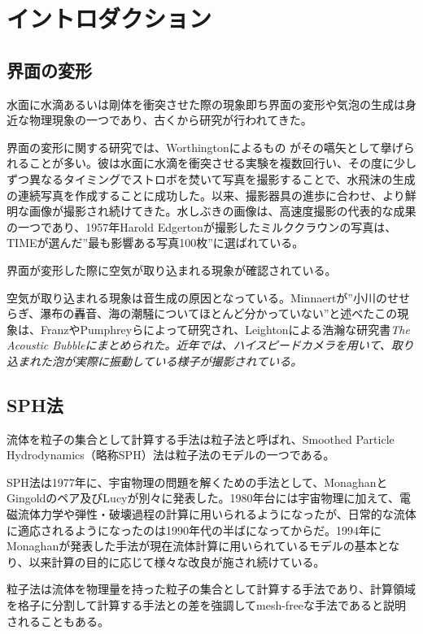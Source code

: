 \documentclass[]{jsarticle}
\begin{document}
\section{イントロダクション}
\subsection{界面の変形}
水面に水滴あるいは剛体を衝突させた際の現象即ち界面の変形や気泡の生成は身近な物理現象の一つであり、古くから研究が行われてきた。

界面の変形に関する研究では、Worthingtonによるもの \cite{worthington1908}がその嚆矢として擧げられることが多い。彼は水面に水滴を衝突させる実験を複数回行い、その度に少しずつ異なるタイミングでストロボを焚いて写真を撮影することで、水飛沫の生成の連続写真を作成することに成功した。以来、撮影器具の進歩に合わせ、より鮮明な画像が撮影され続けてきた。水しぶきの画像は、高速度撮影の代表的な成果の一つであり、1957年Harold Edgertonが撮影したミルククラウンの写真は、TIMEが選んだ”最も影響ある写真100枚”に選ばれている。

界面が変形した際に空気が取り込まれる現象が確認されている。

空気が取り込まれる現象は音生成の原因となっている。Minnaert\cite{minnaert1933xvi}が”小川のせせらぎ、瀑布の轟音、海の潮騒についてほとんど分かっていない”と述べたこの現象は、Franz\cite{Franz1959}やPumphrey\cite{Pumphrey1990}らによって研究され、Leightonによる浩瀚な研究書\it{The Acoustic Bubble}\cite{leightonacoustic}にまとめられた。近年では、ハイスピードカメラを用いて、取り込まれた泡が実際に振動している様子が撮影されている\cite{Phillips2018}。

\subsection{SPH法}
流体を粒子の集合として計算する手法は粒子法と呼ばれ、\rm{Smoothed Particle Hydrodynamics}（略称SPH）法は粒子法のモデルの一つである。

SPH法は1977年に、宇宙物理の問題を解くための手法として、MonaghanとGingold\cite{Gingold1977}のペア及びLucy\cite{Lucy1977}が別々に発表した。1980年台には宇宙物理に加えて、電磁流体力学や弾性・破壊過程の計算に用いられるようになったが、日常的な流体に適応されるようになったのは1990年代の半ばになってからだ。1994年にMonaghan\cite{Monaghan1994}が発表した手法が現在流体計算に用いられているモデルの基本となり、以来計算の目的に応じて様々な改良が施され続けている。

粒子法は流体を物理量を持った粒子の集合として計算する手法であり、計算領域を格子に分割して計算する手法との差を強調してmesh-freeな手法であると説明されることもある。
\label{subsec:label}




\end{document}
